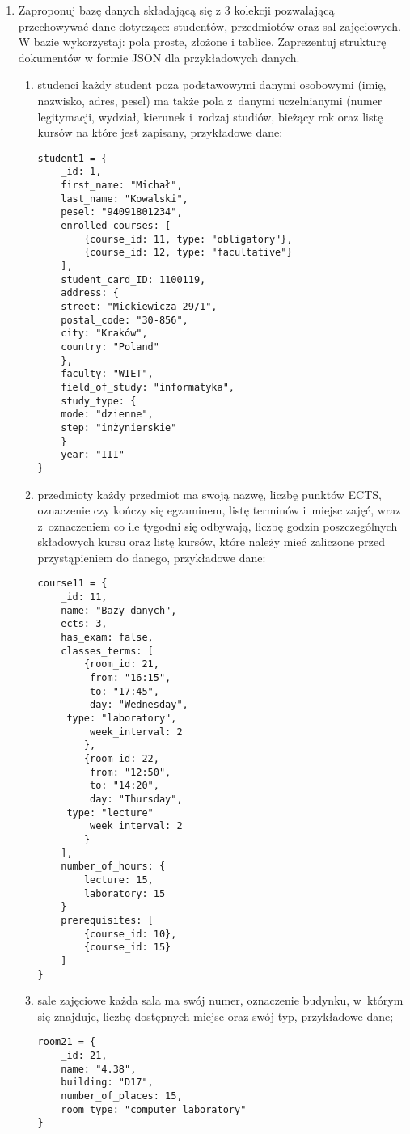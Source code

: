 \documentclass[a4paper,9pt]{extarticle}	%
\begin{document}
\begin{enumerate}
	\item Zaproponuj bazę danych składającą się z 3 kolekcji pozwalającą przechowywać dane dotyczące: studentów, przedmiotów oraz sal zajęciowych. W bazie wykorzystaj: pola proste, złożone i tablice. Zaprezentuj strukturę dokumentów w formie JSON dla przykładowych danych.
	\begin{enumerate}
	  \item studenci \ppauza każdy student poza podstawowymi danymi osobowymi (imię, nazwisko, adres, pesel) ma także pola z~danymi uczelnianymi (numer legitymacji, wydział, kierunek i~rodzaj studiów, bieżący rok oraz listę kursów na które jest zapisany, przykładowe dane:
	  \begin{lstlisting}
student1 = {
    _id: 1,
    first_name: "Michał",
    last_name: "Kowalski",
    pesel: "94091801234",
    enrolled_courses: [
        {course_id: 11, type: "obligatory"},
        {course_id: 12, type: "facultative"}
    ],
    student_card_ID: 1100119,
    address: {
	street: "Mickiewicza 29/1",
	postal_code: "30-856",
	city: "Kraków",
	country: "Poland"
    },
    faculty: "WIET",
    field_of_study: "informatyka",
    study_type: {
	mode: "dzienne",
	step: "inżynierskie"
    }
    year: "III"
}
	  \end{lstlisting}
	  \item przedmioty \ppauza każdy przedmiot ma swoją nazwę, liczbę punktów ECTS, oznaczenie czy kończy się egzaminem, listę terminów i~miejsc zajęć, wraz z~oznaczeniem co ile tygodni się odbywają, liczbę godzin poszczególnych składowych kursu oraz listę kursów, które należy mieć zaliczone przed przystąpieniem do danego, przykładowe dane:
	  \begin{lstlisting}
course11 = {
    _id: 11,
    name: "Bazy danych",
    ects: 3,
    has_exam: false,
    classes_terms: [
        {room_id: 21,
         from: "16:15",
         to: "17:45",
         day: "Wednesday",
	 type: "laboratory",
         week_interval: 2
        },
        {room_id: 22,
         from: "12:50",
         to: "14:20",
         day: "Thursday",
	 type: "lecture"
         week_interval: 2
        }
    ],
    number_of_hours: {
        lecture: 15,
        laboratory: 15
    }
    prerequisites: [
        {course_id: 10},
        {course_id: 15}
    ]
}
	  \end{lstlisting}
	  \item sale zajęciowe \ppauza każda sala ma swój numer, oznaczenie budynku, w~którym się znajduje, liczbę dostępnych miejsc oraz swój typ, przykładowe dane;
	  \begin{lstlisting}
room21 = {
    _id: 21,
    name: "4.38",
    building: "D17",
    number_of_places: 15,
    room_type: "computer laboratory"
}
	  \end{lstlisting}
	\end{enumerate}
\end{enumerate}
\end{document}
